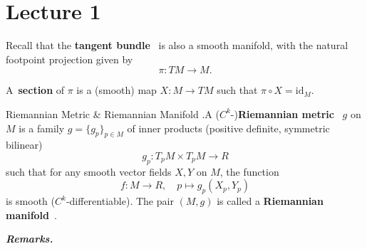 \documentclass{article}
\begin{document}
\tableofcontents

\section{Lecture 1}
\label{sec:lecture1}

Recall that the \textbf{tangent bundle}~ is also a smooth manifold, with the natural footpoint projection given by
\begin{equation}
  \pi : TM \to M.
\end{equation}

A~\textbf{section} of $\pi$ is a (smooth) map $X: M \to TM$ such that $\pi \circ X = \text{id}_M$.

\begin{Definition}{Riemannian Metric \& Riemannian Manifold}
  .A ($C^k$-)\textbf{Riemannian metric}~ $g$ on $M$ is a family $g = \{ g_p\}_{p \in M}$ of inner products (positive definite, symmetric bilinear)
\begin{equation}
  g_p: T_pM \times T_pM \rightarrow R
\end{equation}
such that for any smooth vector fields $X, Y$ on $M$, the function
\begin{equation}
  f : M \rightarrow R, \quad p \mapsto g_p (X_p, Y_p)
\end{equation}
is smooth ($C^k$-differentiable). The pair $(M, g)$ is called a \textbf{Riemannian manifold}~.
\end{Definition}

\textit{\textbf{Remarks.}}
\end{document}
